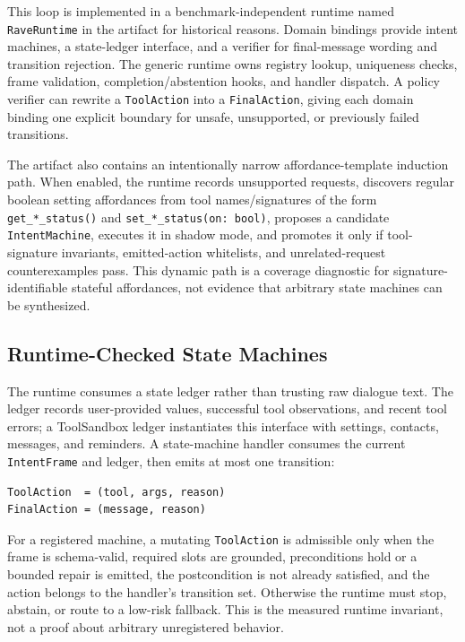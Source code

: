 \documentclass[11pt]{article}
\begin{document}
This loop is implemented in a benchmark-independent runtime named \texttt{RaveRuntime}
in the artifact for historical reasons. Domain bindings provide intent machines, a
state-ledger interface, and a verifier for final-message wording and transition
rejection. The generic runtime owns registry lookup, uniqueness checks, frame validation,
completion/abstention hooks, and handler dispatch. A policy verifier can rewrite a
\texttt{ToolAction} into a \texttt{FinalAction}, giving each domain binding one explicit
boundary for unsafe, unsupported, or previously failed transitions.

The artifact also contains an intentionally narrow affordance-template induction path.
When enabled, the runtime records unsupported requests, discovers regular boolean
setting affordances from tool names/signatures of the form \verb|get_*_status()| and
\verb|set_*_status(on: bool)|, proposes a candidate \texttt{IntentMachine}, executes it
in shadow mode, and promotes it only if tool-signature invariants, emitted-action
whitelists, and unrelated-request counterexamples pass. This dynamic path is a coverage
diagnostic for signature-identifiable stateful affordances, not evidence that arbitrary
state machines can be synthesized.

\subsection{Runtime-Checked State Machines}

The runtime consumes a state ledger rather than trusting raw dialogue text. The ledger
records user-provided values, successful tool observations, and recent tool errors; a
ToolSandbox ledger instantiates this interface with settings, contacts, messages, and
reminders. A state-machine handler consumes the current \texttt{IntentFrame} and ledger,
then emits at most one transition:
\begin{verbatim}
ToolAction  = (tool, args, reason)
FinalAction = (message, reason)
\end{verbatim}

For a registered machine, a mutating \texttt{ToolAction} is admissible only when the
frame is schema-valid, required slots are grounded, preconditions hold or a bounded
repair is emitted, the postcondition is not already satisfied, and the action belongs to
the handler's transition set. Otherwise the runtime must stop, abstain, or route to a
low-risk fallback. This is the measured runtime invariant, not a proof about arbitrary
unregistered behavior.
\end{document}
